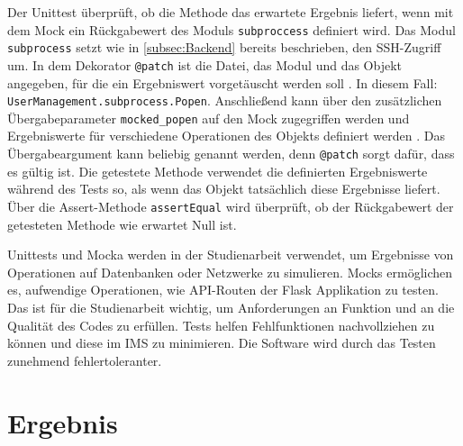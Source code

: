 \documentclass[a4paper,titlepage,halfparskip,12pt]{scrreprt}
\begin{document}
\begin{onehalfspacing}
Der Unittest überprüft, ob die Methode das erwartete Ergebnis liefert, wenn mit dem Mock ein Rückgabewert des Moduls \texttt{subproccess} definiert wird. Das Modul \texttt{subprocess} setzt wie in \autoref{subsec:Backend} bereits beschrieben, den \acs{SSH}-Zugriff um. In dem Dekorator \texttt{@patch} ist die Datei, das Modul und das Objekt angegeben, für die ein Ergebniswert vorgetäuscht werden soll \cite{hubertz2016softwaretests}. In diesem Fall: \texttt{UserManagement.subprocess.Popen}. Anschließend kann über den zusätzlichen Übergabeparameter \texttt{mocked\_popen} auf den Mock zugegriffen werden und Ergebniswerte für verschiedene Operationen des Objekts definiert werden \cite{hubertz2016softwaretests}. Das Übergabeargument kann beliebig genannt werden, denn \texttt{@patch} sorgt dafür, dass es gültig ist. Die getestete Methode verwendet die definierten Ergebniswerte während des Tests so, als wenn das Objekt tatsächlich diese Ergebnisse liefert. Über die Assert-Methode \texttt{assertEqual} wird überprüft, ob der Rückgabewert der getesteten Methode wie erwartet Null ist.

\pagebreak

Unittests und Mocka werden in der Studienarbeit verwendet, um Ergebnisse von Operationen auf Datenbanken oder Netzwerke zu simulieren. Mocks ermöglichen es, aufwendige Operationen, wie \acs{API}-Routen der Flask Applikation zu testen. Das ist für die Studienarbeit wichtig, um Anforderungen an Funktion und an die Qualität des Codes zu erfüllen. Tests helfen Fehlfunktionen nachvollziehen zu können und diese im \acs{IMS} zu minimieren. Die Software wird durch das Testen zunehmend fehlertoleranter.

\pagebreak

\chapter{Ergebnis}
\label{chap:Ergebnis}


\end{onehalfspacing}
\end{document}
